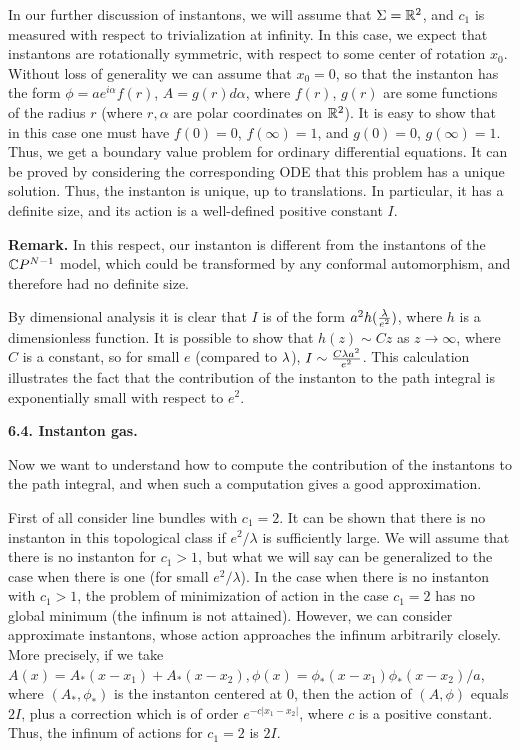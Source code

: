 In our further discussion of instantons, we will assume that $\Sigma=\Bbb R^2$, 
and $c_1$ is measured with respect to trivialization at infinity. 
In this case, we expect that instantons are 
rotationally symmetric, with respect to some center of rotation $x_0$. 
Without loss of generality we can assume that $x_0=0$, so that the instanton 
has the form $\phi=ae^{i\alpha}f(r)$, $A=g(r)d\alpha$, where 
$f(r)$, $g(r)$ are some functions of the radius $r$ (where $r,\alpha$ 
are polar coordinates on $\Bbb R^2$). It is easy to show 
that in this case one must have $f(0)=0$, $f(\infty)=1$, 
and $g(0)=0$, $g(\infty)=1$. Thus, we get a boundary value problem for
ordinary differential equations. It can be proved by considering 
the corresponding ODE that this problem 
has a unique solution. Thus, the instanton is unique, up to translations. 
In particular, it has a definite size, and its action is 
a well-defined positive constant $I$.  

{\bf Remark.} In this respect, our instanton is different from 
the instantons of the $\Bbb C P^{N-1}$ model, which could be 
transformed by any conformal automorphism, and therefore had no 
definite size. 

By dimensional analysis 
it is clear that $I$ is of the form $a^2h(\frac{\lambda}{e^2})$, 
where $h$ is a dimensionless function. It is possible to show that
$h(z)\sim Cz$ as $z\to \infty$, where $C$ is a constant, 
so for small $e$ (compared to $\lambda$), $I\sim \frac{C\lambda a^2}{e^2}$.   
This calculation illustrates
the fact that the contribution of the instanton to the path integral 
is exponentially small with respect to $e^2$. 

{\bf 6.4. Instanton gas.}

Now we want to understand how to compute the contribution of the instantons 
to the path integral, and when such a computation gives a good approximation. 

First of all consider line bundles with $c_1=2$. It can be shown that 
there is no instanton in this topological class if $e^2/\lambda$ is 
sufficiently large. We will assume that there is no instanton 
for $c_1>1$, but what we will say can be generalized to the case 
when there is one (for small $e^2/\lambda$). In the case when there
is no instanton with $c_1>1$,  
the problem of minimization of action in the case $c_1=2$ has no global 
minimum (the infinum is not attained). However, 
we can consider approximate instantons, whose action approaches
the infinum arbitrarily closely. More precisely, if we take 
$A(x)=A_*(x-x_1)+A_*(x-x_2),\phi(x)=\phi_*(x-x_1)\phi_*(x-x_2)/a$, where
$(A_*,\phi_*)$ is the instanton centered at $0$, then the action 
of $(A,\phi)$ equals $2I$, plus a correction which is of order
$e^{-c|x_1-x_2|}$, where $c$ is a positive constant.
Thus, the infinum of actions for $c_1=2$ is $2I$. 


